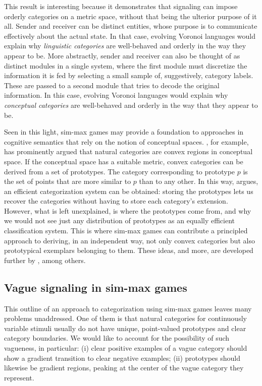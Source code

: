 \documentclass[fleqn,reqno,10pt]{article}
\begin{document}
This result is interesting because it demonstrates that signaling can
impose orderly categories on a metric space, without that being the
ulterior purpose of it all. Sender and receiver can be distinct
entities, whose purpose is to communicate effectively about the actual
state. In that case, evolving Voronoi languages would explain why
\emph{linguistic categories} are well-behaved and orderly in the way
they appear to be. More abstractly, sender and receiver can also be
thought of as distinct modules in a single system, where the first
module must discretize the information it is fed by selecting a small
sample of, suggestively, category labels. These are passed to a second
module that tries to decode the original information. In this case,
evolving Voronoi languages would explain why \emph{conceptual
  categories} are well-behaved and orderly in the way that they appear
to be.

Seen in this light, sim-max games may provide a foundation to
approaches in cognitive semantics that rely on the notion of
conceptual spaces.  \citet[][70--77]{Gardenfors2000:Conceptual-Spac},
for example, has prominently argued that natural categories are convex
regions in conceptual space. If the conceptual space has a suitable
metric, convex categories can be derived from a set of prototypes. The
category corresponding to prototype $p$ is the set of points that are
more similar to $p$ than to any other. In this way,
\citet{Gardenfors2000:Conceptual-Spac} argues, an efficient
categorization system can be obtained: storing the prototypes lets us
recover the categories without having to store each category's
extension. However, what is left unexplained, is where the prototypes
come from, and why we would not see just any distribution of
prototypes as an equally efficient classification system. This is
where sim-max games can contribute a principled approach to deriving,
in an independent way, not only convex categories but also
prototypical exemplars belonging to them.
These ideas, and more, are developed further by \citet{Jager2007:The-Evolution-o,JagerRooijvan-Rooij2007:Language-Struct,JagerMetzger2011:Voronoi-Languag,OConnor2014-OCOEPC}, among others.

\subsection{Vague signaling in sim-max games}

This outline of an approach to categorization using sim-max games
leaves many problems unaddressed. One of them is that natural
categories for continuously variable stimuli usually do not have
unique, point-valued prototypes and clear category boundaries. We
would like to account for the possibility of such vagueness, in
particular: (i) clear positive examples of a vague category should
show a gradient transition to clear negative examples;
(ii) prototypes should likewise be gradient regions, peaking at the
center of the vague category they represent.
\end{document}
